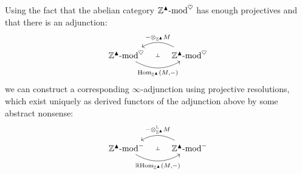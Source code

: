             \begin{remark} \label{remark: derived_tensor_products_and_homs_for_condensed_abelian_groups}
                Using the fact that the abelian category $\mathbb{Z}^{\blacktriangle}\text{-}\mathrm{mod}^{\heartsuit}$ has enough projectives and that there is an adjunction:
                    $$
                        \begin{tikzcd}
                        	{\Z^{\cond}\mod^{\heart}} & {\Z^{\cond}\mod^{\heart}}
                        	\arrow[""{name=0, anchor=center, inner sep=0}, "{\Hom_{\Z^{\cond}}(M, -)}"', bend right, from=1-1, to=1-2]
                        	\arrow[""{name=1, anchor=center, inner sep=0}, "{- \tensor_{\Z^{\cond}} M}"', bend right, from=1-2, to=1-1]
                        	\arrow["\dashv"{anchor=center, rotate=-90}, draw=none, from=1, to=0]
                        \end{tikzcd}
                    $$
                we can construct a corresponding $\infty$-adjunction using projective resolutions, which exist uniquely as derived functors of the adjunction above by some abstract nonsense:
                    $$
                        \begin{tikzcd}
                        	{\Z^{\cond}\mod^-} & {\Z^{\cond}\mod^-}
                        	\arrow[""{name=0, anchor=center, inner sep=0}, "{\R\Hom_{\Z^{\cond}}(M, -)}"', bend right, from=1-1, to=1-2]
                        	\arrow[""{name=1, anchor=center, inner sep=0}, "{- \tensor_{\Z^{\cond}}^{\L} M}"', bend right, from=1-2, to=1-1]
                        	\arrow["\dashv"{anchor=center, rotate=-90}, draw=none, from=1, to=0]
                        \end{tikzcd}
                    $$
            \end{remark}
